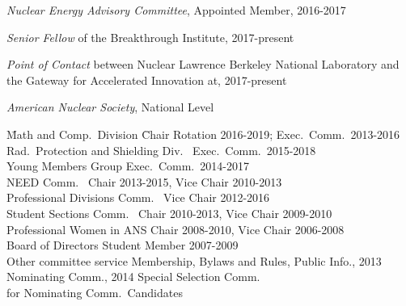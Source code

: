 \textit{Nuclear Energy Advisory Committee}, Appointed Member, 2016-2017



\textit{Senior Fellow} of the Breakthrough Institute, 2017-present

\textit{Point of Contact} between Nuclear Lawrence Berkeley National Laboratory and the Gateway for Accelerated Innovation at, 2017-present

\textit{American Nuclear Society}, National Level
\begin{tabbing}
\hspace*{2 em}\= Math and Comp.\ Division \hspace*{6em} \= Chair Rotation 2016-2019; Exec.\ Comm.\ 2013-2016 \\
%
\> Rad.\ Protection and Shielding Div.\ \> Exec.\ Comm.\ 2015-2018\\
%
\> Young Members Group \> Exec.\ Comm.\ 2014-2017\\
%
\> NEED Comm.\ \> Chair 2013-2015, Vice Chair 2010-2013\\
%
\> Professional Divisions Comm.\ \> Vice Chair 2012-2016 \\
%
\> Student Sections Comm.\ \> Chair 2010-2013, Vice Chair 2009-2010\\
%
\> Professional Women in ANS \> Chair 2008-2010, Vice Chair 2006-2008\\	
%
\> Board of Directors \> Student Member 2007-2009\\
%
\> Other committee service \>	Membership, Bylaws and Rules, Public Info., 2013 \\ \> \> Nominating Comm., 2014 Special Selection Comm.\ \\ \> \> for Nominating Comm.\ Candidates
\end{tabbing}


